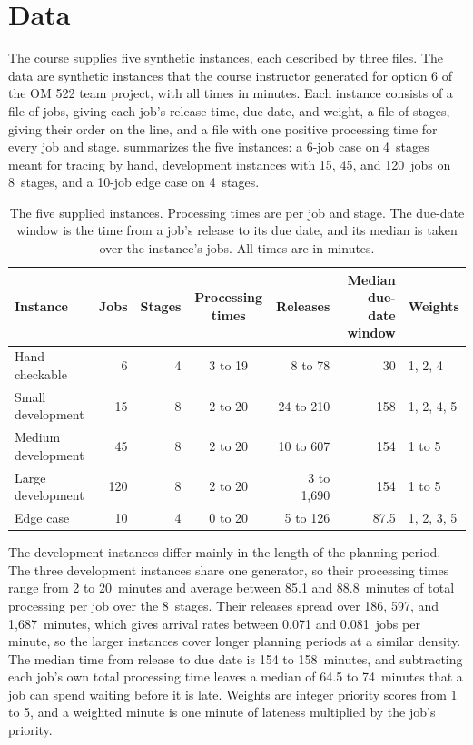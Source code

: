 \section{Data}\label{sec:data}

\sumpara The course supplies five synthetic instances, each described by three files. \sumparaend
\fin The data are synthetic instances that the course instructor generated for option 6 of the OM 522 team project, with all times in minutes. \fine
\fin Each instance consists of a file of jobs, giving each job's release time, due date, and weight, a file of stages, giving their order on the line, and a file with one positive processing time for every job and stage. \fine
\fin {} summarizes the five instances: a 6-job case on 4~stages meant for tracing by hand, development instances with 15, 45, and 120~jobs on 8~stages, and a 10-job edge case on 4~stages. \fine

\begin{table}[ht]
\centering
\caption{The five supplied instances. Processing times are per job and stage. The due-date window is the time from a job's release to its due date, and its median is taken over the instance's jobs. All times are in minutes.}
\label{tab:data}
\small
\setlength{\tabcolsep}{4.5pt}
\begin{tabular}{lrrcrrl}
\toprule
Instance & Jobs & Stages & Processing times & Releases & Median due-date window & Weights \\
\midrule
Hand-checkable & 6 & 4 & 3 to 19 & 8 to 78 & 30 & 1, 2, 4 \\
Small development & 15 & 8 & 2 to 20 & 24 to 210 & 158 & 1, 2, 4, 5 \\
Medium development & 45 & 8 & 2 to 20 & 10 to 607 & 154 & 1 to 5 \\
Large development & 120 & 8 & 2 to 20 & 3 to 1,690 & 154 & 1 to 5 \\
Edge case & 10 & 4 & 0 to 20 & 5 to 126 & 87.5 & 1, 2, 3, 5 \\
\bottomrule
\end{tabular}
\end{table}

\sumpara The development instances differ mainly in the length of the planning period. \sumparaend
\fin The three development instances share one generator, so their processing times range from 2 to 20~minutes and average between 85.1 and 88.8~minutes of total processing per job over the 8~stages. \fine
\fin Their releases spread over 186, 597, and 1,687~minutes, which gives arrival rates between 0.071 and 0.081~jobs per minute, so the larger instances cover longer planning periods at a similar density. \fine
\fin The median time from release to due date is 154 to 158~minutes, and subtracting each job's own total processing time leaves a median of 64.5 to 74~minutes that a job can spend waiting before it is late. \fine
\fin Weights are integer priority scores from 1 to 5, and a weighted minute is one minute of lateness multiplied by the job's priority. \fine


